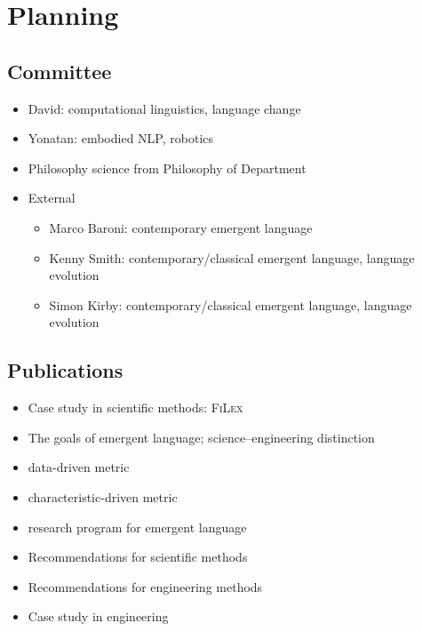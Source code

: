 \setcounter{chapter}{-1}
\chapter{Planning}

\section{Committee}
\begin{itemize}
    \item David: computational linguistics, language change
    \item Yonatan: embodied NLP, robotics
    \item {} Philosophy science from Philosophy of Department
    \item {} External
        \begin{itemize}
        \item Marco Baroni: contemporary emergent language
        \item Kenny Smith: contemporary/classical emergent language, language evolution
        \item Simon Kirby: contemporary/classical emergent language, language evolution
        \end{itemize}
\end{itemize}

\section{Publications}
\begin{itemize}
    \item{}  Case study in scientific methods: \textsc{FiLex}
    \item{}  The goals of emergent language; science--engineering distinction
    \item{}   data-driven metric
    \item{}   characteristic-driven metric
    \item{}  research program for emergent language
    \item{}  Recommendations for scientific methods
    \item{}  Recommendations for engineering methods
    \item{}   Case study in engineering
\end{itemize}

